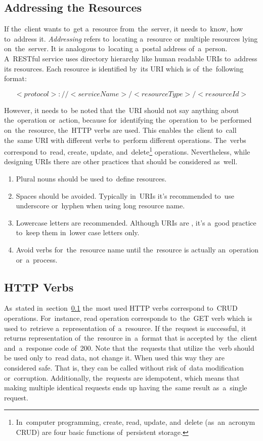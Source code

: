 \subsection{Addressing the Resources}
\label{sec-addressing}
If the~client wants to~get a~resource from~the~server, it needs to~know, how
to~address it. \textit{Addressing} refers to~locating a~resource or~multiple
resources lying on~the~server. It is analogous to~locating a~postal address
of~a~person. A~RESTful service uses directory hierarchy like human readable URIs
to~address its resources. Each resource is identified by~its URI which is
of~the~following format:

\begin{equation}
<protocol>://<serviceName>/<resourceType>/<resourceId>
\end{equation}

However, it needs to~be noted that the~URI should not say anything about
the~operation or~action, because for~identifying the~operation to~be performed
on~the~resource, the~HTTP verbs are used. This enables the~client to~call
the~same URI with different verbs to~perform different operations. The~verbs
correspond to~read, create, update, and~delete\footnote{In~computer
programming, create, read, update, and~delete (as~an~acronym CRUD) are four
basic functions of~persistent storage.} operations. Nevertheless, while
designing URIs there are other practices that should be considered as~well.

\begin{enumerate}
  \item Plural nouns should be used to~define resources.
  \item Spaces should be avoided. Typically in~URIs it's recommended to~use
  underscore or~hyphen when using long resource name.
  \item Lowercase letters are recommended. Although URIs are
  , it's a~good practice to~keep them in~lower case letters
  only.
  \item Avoid verbs for~the~resource name until the~resource is actually
  an~operation or~a~process.
\end{enumerate}


\subsection{HTTP Verbs}
\label{lab-verbs}
As~stated in~section~\ref{sec-addressing} the~most used HTTP verbs correspond
to~CRUD operations. For~instance, read operation corresponds to~the~GET verb
which is used to~retrieve a~representation of~a~resource. If the~request is
successful, it returns representation of~the~resource in~a~format that is
accepted by~the~client and~a~response code of~200. Note that the~requests that
utilize the~verb should be used only to~read data, not change it. When used this
way they are considered safe. That is, they can be called without risk of~data
modification or~corruption. Additionally, the~requests are idempotent, which
means that making multiple identical requests ends up having the~same result
as~a~single request.


